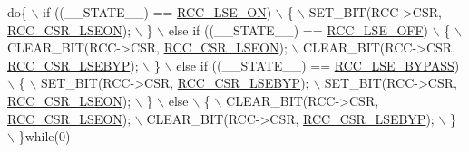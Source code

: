 \begin{DoxyCode}
\textcolor{keywordflow}{do}\{                                                     \(\backslash\)
                      if ((\_\_STATE\_\_) == \hyperlink{group___r_c_c___l_s_e___config_gac981ea636c2f215e4473901e0912f55a}{RCC\_LSE\_ON})                        \(\backslash\)
                      \{                                                     \(\backslash\)
                        SET\_BIT(RCC->CSR, \hyperlink{group___peripheral___registers___bits___definition_gac5e71f3e06f010bbf7592571e541869a}{RCC\_CSR\_LSEON});                   \(\backslash\)
                      \}                                                     \(\backslash\)
                      else \textcolor{keywordflow}{if} ((\_\_STATE\_\_) == \hyperlink{group___r_c_c___l_s_e___config_ga6645c27708d0cad1a4ab61d2abb24c77}{RCC\_LSE\_OFF})                  \(\backslash\)
                      \{                                                     \(\backslash\)
                        CLEAR\_BIT(RCC->CSR, \hyperlink{group___peripheral___registers___bits___definition_gac5e71f3e06f010bbf7592571e541869a}{RCC\_CSR\_LSEON});                 \(\backslash\)
                        CLEAR\_BIT(RCC->CSR, \hyperlink{group___peripheral___registers___bits___definition_ga2f5198ce9785eab7b8a483b092ff067b}{RCC\_CSR\_LSEBYP});                \(\backslash\)
                      \}                                                     \(\backslash\)
                      else \textcolor{keywordflow}{if} ((\_\_STATE\_\_) == \hyperlink{group___r_c_c___l_s_e___config_gaad580157edbae878edbcc83c5a68e767}{RCC\_LSE\_BYPASS})               \(\backslash\)
                      \{                                                     \(\backslash\)
                        SET\_BIT(RCC->CSR, \hyperlink{group___peripheral___registers___bits___definition_ga2f5198ce9785eab7b8a483b092ff067b}{RCC\_CSR\_LSEBYP});                  \(\backslash\)
                        SET\_BIT(RCC->CSR, \hyperlink{group___peripheral___registers___bits___definition_gac5e71f3e06f010bbf7592571e541869a}{RCC\_CSR\_LSEON});                   \(\backslash\)
                      \}                                                     \(\backslash\)
                      else                                                  \(\backslash\)
                      \{                                                     \(\backslash\)
                        CLEAR\_BIT(RCC->CSR, \hyperlink{group___peripheral___registers___bits___definition_gac5e71f3e06f010bbf7592571e541869a}{RCC\_CSR\_LSEON});                 \(\backslash\)
                        CLEAR\_BIT(RCC->CSR, \hyperlink{group___peripheral___registers___bits___definition_ga2f5198ce9785eab7b8a483b092ff067b}{RCC\_CSR\_LSEBYP});                \(\backslash\)
                      \}                                                     \(\backslash\)
                    \}\textcolor{keywordflow}{while}(0)
\end{DoxyCode}


